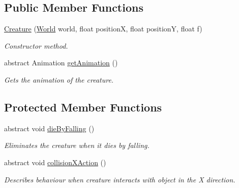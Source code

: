 \subsection*{Public Member Functions}
\begin{DoxyCompactItemize}
\item 
\hyperlink{classnl_1_1arjanfrans_1_1mario_1_1model_1_1Creature_ab8c69d6a20f23355757ee4275a607086}{Creature} (\hyperlink{classnl_1_1arjanfrans_1_1mario_1_1model_1_1World}{World} world, float positionX, float positionY, float f)
\begin{DoxyCompactList}\small\item\em Constructor method. \end{DoxyCompactList}\item 
\mbox{\label{classnl_1_1arjanfrans_1_1mario_1_1model_1_1Creature_af90d849667c2f64b1b578f27e575f444}} 
abstract Animation \hyperlink{classnl_1_1arjanfrans_1_1mario_1_1model_1_1Creature_af90d849667c2f64b1b578f27e575f444}{get\+Animation} ()
\begin{DoxyCompactList}\small\item\em Gets the animation of the creature. \end{DoxyCompactList}\end{DoxyCompactItemize}
\subsection*{Protected Member Functions}
\begin{DoxyCompactItemize}
\item 
\mbox{\label{classnl_1_1arjanfrans_1_1mario_1_1model_1_1Creature_acde9170546655c54aa46b98f35845845}} 
abstract void \hyperlink{classnl_1_1arjanfrans_1_1mario_1_1model_1_1Creature_acde9170546655c54aa46b98f35845845}{die\+By\+Falling} ()
\begin{DoxyCompactList}\small\item\em Eliminates the creature when it dies by falling. \end{DoxyCompactList}\item 
\mbox{\label{classnl_1_1arjanfrans_1_1mario_1_1model_1_1Creature_ac8a2e1db675c8efb0723e5750de80c41}} 
abstract void \hyperlink{classnl_1_1arjanfrans_1_1mario_1_1model_1_1Creature_ac8a2e1db675c8efb0723e5750de80c41}{collision\+X\+Action} ()
\begin{DoxyCompactList}\small\item\em Describes behaviour when creature interacts with object in the X direction. \end{DoxyCompactList}\end{DoxyCompactItemize}
